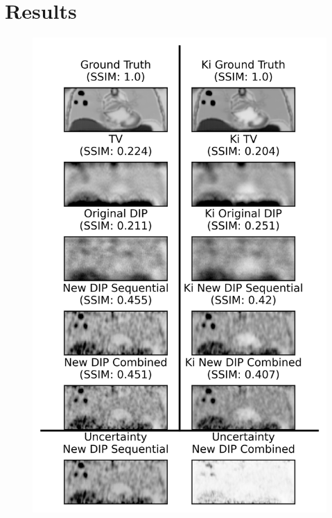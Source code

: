 \section{Results} \label{sec:results}
    \begin{figure}
        
        \centering
    
        \includegraphics[width=1.0\linewidth]{figures/visual_analysis.png}
        
        

\end{figure}
